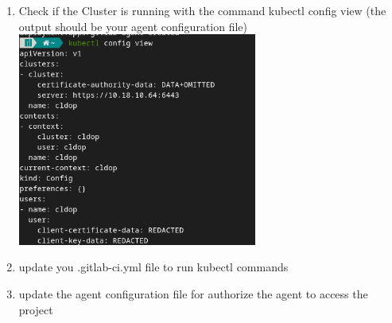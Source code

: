 \begin{enumerate}
    \item Check if the Cluster is running with the command kubectl config view (the output should be your agent configuration file) \newline
    \includegraphics[height=7cm]{resources/ins-cluster-agent-accessing-cluster-test.png}
    \item update you .gitlab-ci.yml file to run kubectl commands
    \item update the agent configuration file for authorize the agent to access the project
\end{enumerate}